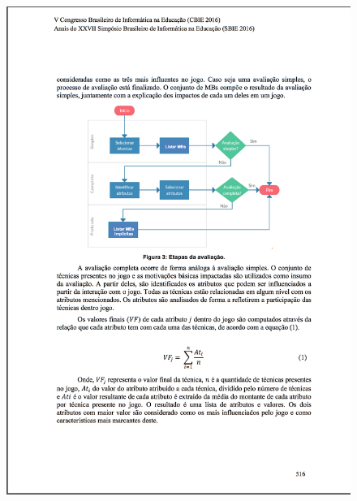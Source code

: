 \begin{apendicesenv}
\begin{figure}[h]
	\centering
		\includegraphics[keepaspectratio=true,scale=0.6]{figuras/a7.png}
\end{figure}


\end{apendicesenv}
